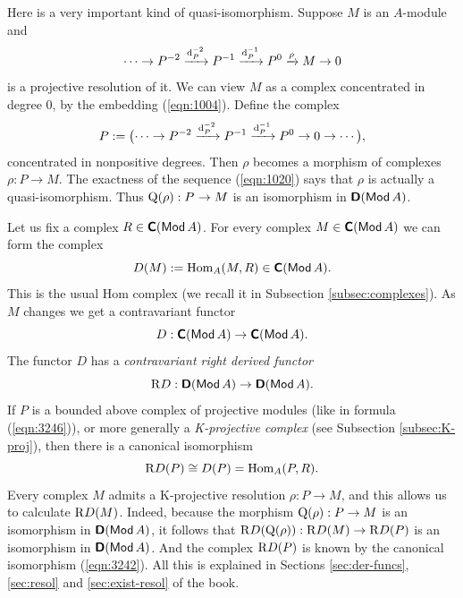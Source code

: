 Here is a very important kind of quasi-isomorphism. Suppose $M$ is an 
$A$-module and 
\begin{equation} \label{eqn:1020}
\cdots \to P^{-2} \xrightarrow{\mathrm{d}_P^{-2}}  P^{-1} \xrightarrow{\mathrm{d}_P^{-1}}  P^{0} 
\xrightarrow{\rho} M \to 0 
\end{equation}
is a projective resolution of it.
We can view $M$ as a complex concentrated in degree $0$, by the embedding 
(\ref{eqn:1004}). Define the complex 
\begin{equation} \label{eqn:3246}
P := \bigl(  \cdots \to P^{-2} \xrightarrow{\mathrm{d}_P^{-2}} 
P^{-1} \xrightarrow{\mathrm{d}_P^{-1}} P^0 \to 0  \to \cdots \bigr) ,
\end{equation}
concentrated in nonpositive degrees. 
Then $\rho$ becomes a morphism of complexes 
$\rho : P \to  M$.
The exactness of the sequence (\ref{eqn:1020}) says that $\rho$ is actually a 
quasi-iso\-morphism. 
Thus $\operatorname{Q}(\rho) : P^{} \to M$
is an isomorphism in $\boldsymbol{\mathsf{D}}(\operatorname{\mathsf{Mod}} A)$.

Let us fix a complex $R \in \boldsymbol{\mathsf{C}}(\operatorname{\mathsf{Mod}} A)$.
For every complex $M \in \boldsymbol{\mathsf{C}}(\operatorname{\mathsf{Mod}} A)$ we can form the complex
\[ D(M) := \operatorname{Hom}_{A}(M, R) \in \boldsymbol{\mathsf{C}}(\operatorname{\mathsf{Mod}} A) . \]
This is the usual Hom complex (we recall it in 
Subsection \ref{subsec:complexes}). 
As $M$ changes we get a contravariant functor 
\[ D : \boldsymbol{\mathsf{C}}(\operatorname{\mathsf{Mod}} A) \to \boldsymbol{\mathsf{C}}(\operatorname{\mathsf{Mod}} A) . \]
The functor $D$ has a {\em contravariant right derived functor} 
\begin{equation} \label{eqn:5002}
\mathrm{R} D : \boldsymbol{\mathsf{D}}(\operatorname{\mathsf{Mod}} A) \to \boldsymbol{\mathsf{D}}(\operatorname{\mathsf{Mod}} A) .
\end{equation}
If $P$ is a bounded above complex of projective modules (like in formula 
(\ref{eqn:3246})), or more generally a {\em K-projective complex}
(see Subsection \ref{subsec:K-proj}), then there is a canonical isomorphism
\begin{equation} \label{eqn:3242}
\mathrm{R} D(P) \cong D(P) = \operatorname{Hom}_A(P, R) . 
\end{equation}
Every complex $M$ admits a K-projective resolution
$\rho : P \to M$, and this allows us to calculate $\mathrm{R} D(M)$.
Indeed, because the morphism 
$\operatorname{Q}(\rho) : P \to M$ 
is an isomorphism in 
$\boldsymbol{\mathsf{D}}(\operatorname{\mathsf{Mod}} A)$, it follows that 
$\mathrm{R} D(\operatorname{Q}(\rho)) : \mathrm{R} D(M) \to \mathrm{R} D(P)$
is an isomorphism in $\boldsymbol{\mathsf{D}}(\operatorname{\mathsf{Mod}} A)$. 
And the complex $\mathrm{R} D(P)$ is known by the canonical isomorphism 
(\ref{eqn:3242}). All this is explained in Sections \ref{sec:der-funcs}, 
\ref{sec:resol} and \ref{sec:exist-resol} of the book. 

